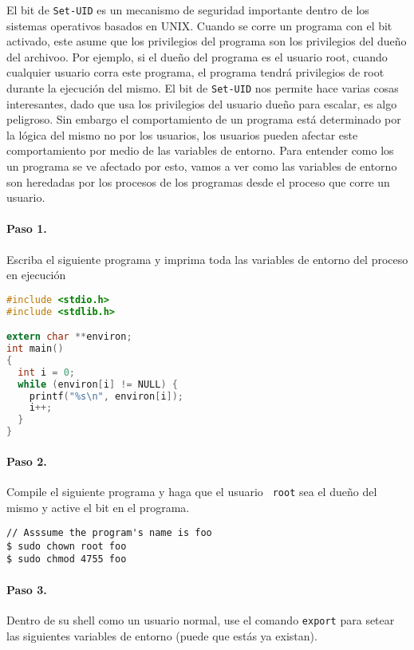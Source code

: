 El bit de {\tt Set-UID} es un mecanismo de seguridad importante dentro de los sistemas operativos basados en UNIX.
Cuando se corre un programa con el bit \setuid activado, este asume que los privilegios del programa son los privilegios del dueño del archivoo. Por ejemplo, si el dueño del programa es el usuario root, cuando cualquier usuario corra este programa, el programa tendrá privilegios de root durante la ejecución del mismo.
El bit de {\tt Set-UID} nos permite hace varias cosas interesantes, dado que usa los privilegios del usuario dueño para escalar, es algo peligroso. Sin embargo el comportamiento de un programa \setuid está determinado por la lógica del mismo no por los usuarios, los usuarios pueden afectar este comportamiento por medio de las variables de entorno.
Para entender como los un programa \setuid se ve afectado por esto, vamos a ver como las variables de entorno son heredadas por los procesos de los programas \setuid desde el proceso que corre un usuario.


\paragraph{Paso 1.} Escriba el siguiente programa y imprima toda las variables de entorno del proceso en ejecución

\begin{lstlisting}[language=C]
#include <stdio.h>
#include <stdlib.h>

extern char **environ;
int main()
{
  int i = 0;
  while (environ[i] != NULL) {
    printf("%s\n", environ[i]);
    i++;
  }
}
\end{lstlisting}


\paragraph{Paso 2.} Compile el siguiente programa y haga que el usuario {\tt
root} sea el dueño del mismo y active el bit \setuid en el programa. 

\begin{lstlisting}
// Asssume the program's name is foo
$ sudo chown root foo
$ sudo chmod 4755 foo
\end{lstlisting}



\paragraph{Paso 3.} Dentro de su shell como un usuario normal, use el comando {\tt export} para setear las siguientes variables de entorno (puede que estás ya existan).

